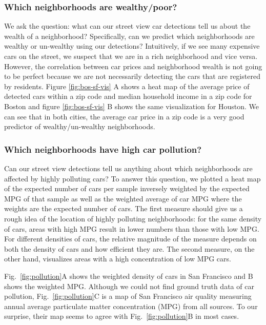 \documentclass[10pt,twocolumn,letterpaper]{article}
\begin{document}
\subsubsection{Which neighborhoods are wealthy/poor?}
We ask the question: what can our street view car detections tell us about the wealth of a neighborhood? Specifically, can we predict which neighborhoods are wealthy or un-wealthy using our detections? Intuitively, if we see many expensive cars on the street, we suspect that we are in a rich neighborhood and vice versa. However, the correlation between car prices and neighborhood wealth is not going to be perfect because we are not necessarily detecting the cars that are registered by residents. Figure \ref{fig:bos-sf-vis} A shows a heat map of the average price of detected cars within a zip code and median household income in a zip code for Boston and figure \ref{fig:bos-sf-vis} B shows the same visualization for Houston. We can see that in both cities, the average car price in a zip code is a very good predictor of wealthy/un-wealthy neighborhoods.


\subsubsection{Which neighborhoods have high car pollution?}
Can our street view detections tell us anything about which neighborhoods are affected by highly polluting cars? To answer this question, we plotted a heat map of the expected number of cars per sample inversely weighted by the expected MPG of that sample as well as the weighted average of car MPG where the weights are the expected number of cars. The first measure should give us a rough idea of the location of highly polluting neighborhoods: for the same density of cars, areas with high MPG result in lower numbers than those with low MPG. For different densities of cars, the relative magnitude of the measure depends on both the density of cars and how efficient they are. The second measure, on the other hand, visualizes areas with a high concentration of low MPG cars.

Fig.~\ref{fig:pollution}A shows the weighted density of cars in San Francisco and B shows the weighted MPG. Although we could not find ground truth data of car pollution, Fig.~\ref{fig:pollution}C is a map of San Francisco air quality measuring annual average particulate matter concentration (MPG) from all sources. To our surprise, their map seems to agree with Fig.~\ref{fig:pollution}B in most cases.
\end{document}
